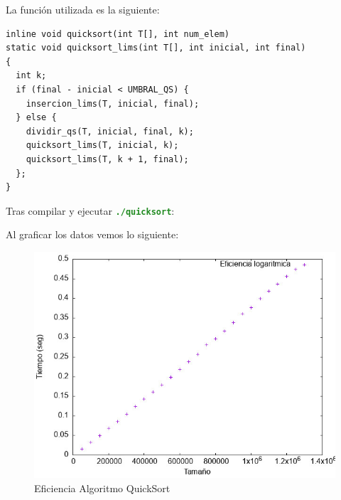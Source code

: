 \documentclass[12pt, spanish]{article}
\def\code#1{\texttt{#1}}
\begin{document}
\newpage
La función utilizada es la siguiente:

\begin{verbatim}
inline void quicksort(int T[], int num_elem)
static void quicksort_lims(int T[], int inicial, int final)
{
  int k;
  if (final - inicial < UMBRAL_QS) {
    insercion_lims(T, inicial, final);
  } else {
    dividir_qs(T, inicial, final, k);
    quicksort_lims(T, inicial, k);
    quicksort_lims(T, k + 1, final);
  };
}
\end{verbatim}

Tras compilar y ejecutar \textcolor{ForestGreen}{\textbf{\code{./quicksort}}}:



Al graficar los datos vemos lo siguiente:

\begin{figure}[H]
  \centering
  \includegraphics[scale = 0.9]{quicksort.jpeg}
  \caption{Eficiencia Algoritmo QuickSort}
\end{figure}

\newpage
\end{document}
